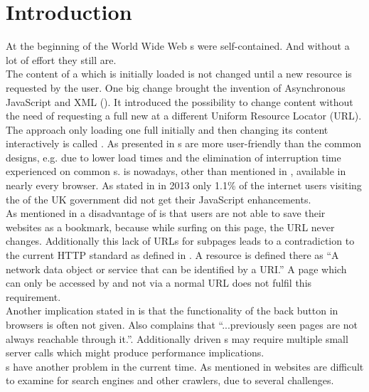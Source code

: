\section{Introduction}
At the beginning of the World Wide Web \webPage{}s were self-contained. 
And without a lot of effort they still are. 
\\
The content of a \webPage{} which is initially loaded is not changed until a new resource is requested by the user.
One big change brought the invention of Asynchronous JavaScript and XML (\ajax{}).
It introduced the possibility to change content without the need of requesting a full new \webPage{} at a different Uniform Resource Locator (URL).
The approach only loading one full \webPage{} initially and then changing its content interactively is called \singlePageApplication{}.
As presented in \cite{jonsson2009database} \singlePageApplication{}s are more user-friendly than the common designs, e.g. due to lower load times and the elimination of interruption time experienced on common \webApplication{}s.
\ajax{} is nowadays, other than mentioned in \cite{jonsson2009database}, available in nearly every browser.
As stated in \cite{herlihy2013howmany} in 2013 only 1.1\% of the internet users visiting the \webSite{} of the UK government did not get their JavaScript enhancements.
\\
As mentioned in \cite{jonsson2009database} a disadvantage of \ajax{} is that users are not able to save their websites as a bookmark, because while surfing on this page, the URL never changes.
Additionally this lack of URLs for subpages leads to a contradiction to the current HTTP standard as defined in \cite{fielding1999hypertext}.
A resource is defined there as \enquote{A network data object or service that can be identified by a URI.}
A page which can only be accessed by \ajax{} and not via a normal URL does not fulfil this requirement.
\\
Another implication stated in \cite{jonsson2009database} is that the functionality of the back button in browsers is often not given.
Also \cite{estrada2011take} complains that \enquote{...previously seen pages are not always reachable through it.}.
Additionally \ajax{} driven \webApplication{}s may require multiple small server calls which might produce performance implications.
\\
\SinglePageApplication{}s have another problem in the current time. 
As mentioned in \cite{matter2008ajax} \ajax{} websites are difficult to examine for search engines and other crawlers, due to several challenges.
